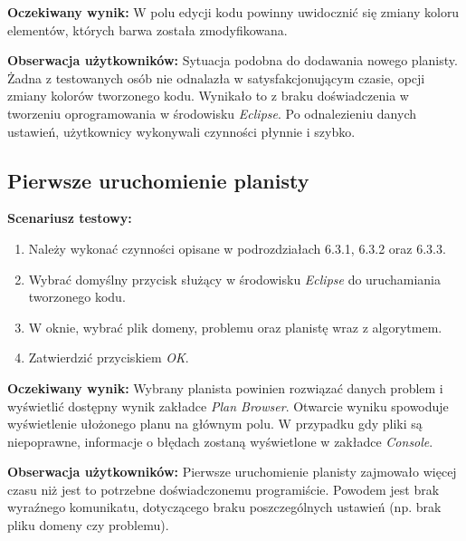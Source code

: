 \textbf{Oczekiwany wynik:} W polu edycji kodu powinny uwidocznić się zmiany koloru elementów, których barwa została zmodyfikowana.

\textbf{Obserwacja użytkowników:} Sytuacja podobna do dodawania nowego planisty. Żadna z testowanych osób nie odnalazła w satysfakcjonującym czasie, opcji zmiany kolorów tworzonego kodu. Wynikało to z braku doświadczenia w tworzeniu oprogramowania w środowisku \textit{Eclipse}. Po odnalezieniu danych ustawień, użytkownicy wykonywali czynności płynnie i szybko. 
\subsection{Pierwsze uruchomienie planisty}
\textbf{Scenariusz testowy:}
  \begin{enumerate}
  
\item Należy wykonać czynności opisane w podrozdziałach 6.3.1, 6.3.2 oraz 6.3.3.
\item Wybrać domyślny przycisk służący w środowisku \textit{Eclipse} do uruchamiania tworzonego kodu.
\item W oknie, wybrać plik domeny, problemu oraz planistę wraz z algorytmem.
\item Zatwierdzić przyciskiem \textit{OK}. 
\end{enumerate}

\textbf{Oczekiwany wynik:} Wybrany planista powinien rozwiązać danych problem i wyświetlić dostępny wynik zakładce \textit{Plan Browser}. Otwarcie wyniku spowoduje wyświetlenie ułożonego planu na głównym polu. W przypadku gdy pliki są niepoprawne, informacje o błędach zostaną wyświetlone w zakładce \textit{Console}. 

\textbf{Obserwacja użytkowników:} Pierwsze uruchomienie planisty zajmowało więcej czasu niż jest to potrzebne doświadczonemu programiście. Powodem jest brak wyraźnego komunikatu, dotyczącego braku poszczególnych ustawień (np. brak pliku domeny czy problemu).



